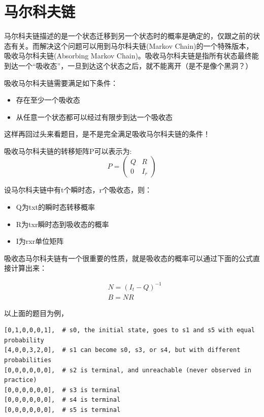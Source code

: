 \documentclass[12pt]{article}
\begin{document}
\section{马尔科夫链}\label{ux9a6cux5c14ux79d1ux592bux94fe}

马尔科夫链描述的是一个状态迁移到另一个状态时的概率是确定的，仅跟之前的状态有关。而解决这个问题可以用到马尔科夫链(Markov Chain)的一个特殊版本，吸收马尔科夫链(Absorbing Markov Chain)。吸收马尔科夫链是指所有状态最终能到达一个``吸收态''，一旦到达这个状态之后，就不能离开（是不是像个黑洞？）

吸收马尔科夫链需要满足如下条件：

\begin{itemize}
\tightlist
\item
  存在至少一个吸收态
\item
  从任意一个状态都可以经过有限步到达一个吸收态
\end{itemize}

这样再回过头来看题目，是不是完全满足吸收马尔科夫链的条件！

吸收马尔科夫链的转移矩阵P可以表示为: \[
P = \begin{pmatrix} Q & R \\ 0  & I_{r} \end{pmatrix}
\]

设马尔科夫链中有t个瞬时态，r个吸收态，则：

\begin{itemize}
\tightlist
\item
  Q为txt的瞬时态转移概率
\item
  R为txr瞬时态到吸收态的概率
\item
  I为rxr单位矩阵
\end{itemize}

吸收态马尔科夫链有一个很重要的性质，就是吸收态的概率可以通过下面的公式直接计算出来：

\begin{align}
&N =(I_{t} - Q)^{-1} \\
&B = NR
\end{align}

以上面的题目为例，

\begin{verbatim}
[0,1,0,0,0,1],  # s0, the initial state, goes to s1 and s5 with equal probability
[4,0,0,3,2,0],  # s1 can become s0, s3, or s4, but with different probabilities
[0,0,0,0,0,0],  # s2 is terminal, and unreachable (never observed in practice)
[0,0,0,0,0,0],  # s3 is terminal
[0,0,0,0,0,0],  # s4 is terminal
[0,0,0,0,0,0],  # s5 is terminal
\end{verbatim}
\end{document}
